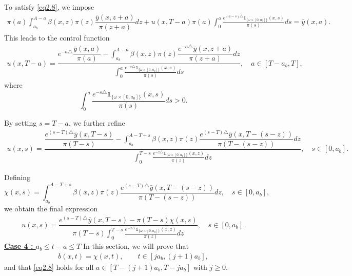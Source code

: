 \documentclass[10pt,a4paper]{amsart}
\makeatletter
\renewenvironment{proof}[1][\proofname]{\par
  \pushQED{\qed}%
  \normalfont \topsep6\p@\@plus6\p@\relax
  \trivlist
  \item[\hskip\labelsep
        \itshape
    #1\ \ref{#1}.]\ignorespaces
}{%
  \popQED\endtrivlist\@endpefalse
}
\makeatother
\begin{document}
\begin{proof}[of Proposition \ref{pr2.3}]
To satisfy \eqref{eq2.8}, we impose  
\begin{align*}
 \pi(a) \int_{a_b}^{A-a} \beta(x,z)  \pi(z) \dfrac{\bar{y}(x,z+a)}{\pi(z+a)} dz + u(x,T-a) \pi(a) \int_{0}^{a} \frac{e^{(a-s)\triangle} \mathds{1}_{\lbrace\omega\times[0,a_0]\rbrace}(x,s)}{\pi(s)} ds = \bar{y}(x,a).
\end{align*}  
This leads to the control function  
\begin{align}
    u(x,T-a) = \dfrac{e^{-a\triangle} \dfrac{\bar{y}(x,a)}{\pi(a)} - \displaystyle\int_{a_b}^{A-a} \beta(x,z)  \pi(z) \dfrac{e^{-a\triangle} \bar{y}(x,z+a)}{\pi(z+a)} dz}{\displaystyle\int_{0}^{a} \frac{e^{-s\triangle} \mathds{1}_{\lbrace\omega\times[0,a_0]\rbrace}(x,s)}{\pi(s)} ds}, \quad a\in [T-a_b,T],
\end{align}  
where  
\begin{equation*}
\int_{0}^{a} \frac{e^{-s\triangle} \mathds{1}_{\lbrace\omega\times[0,a_0]\rbrace}(x,s)}{\pi(s)} ds > 0.
\end{equation*}  

By setting \( s = T-a \), we further refine  
\begin{align*}
u(x,s) = \dfrac{\dfrac{e^{(s-T)\triangle} \bar{y}(x,T-s)}{\pi(T-s)} - \displaystyle\int_{a_b}^{A-T+s} \beta(x,z)  \pi(z) \dfrac{e^{(s-T)\triangle} \bar{y}(x,T-(s-z))}{\pi(T-(s-z))} dz}{\displaystyle\int_{0}^{T-s} \frac{e^{-z\triangle} \mathds{1}_{\lbrace\omega\times[0,a_0]\rbrace}(x,z)}{\pi(z)} dz}, \quad s\in[0,a_b].
\end{align*}  

Defining  
\begin{equation}
\chi(x,s) = \int_{a_b}^{A-T+s} \beta(x,z)  \pi(z) \dfrac{e^{(s-T)\triangle} \bar{y}(x,T-(s-z))}{\pi(T-(s-z))} dz, \quad s\in[0,a_b],
\end{equation}  
we obtain the final expression  
\begin{align}\label{eq2.17}
    u(x,s) = \dfrac{e^{(s-T)\triangle} \bar{y}(x,T-s) - \pi(T-s) \chi(x,s)}{\pi(T-s) \displaystyle\int_{0}^{T-s} \frac{e^{-z\triangle} \mathds{1}_{\lbrace\omega\times[0,a_0]\rbrace}(x,z)}{\pi(z)} dz}, \quad s\in[0,a_b].
\end{align}  
\underline{\bf{Case 4 : $a_b\leq t-a\leq T$}}  
In this section, we will prove that  
\begin{align}
b(x,t) =\chi (x,t), \qquad t\in [ja_b, (j+1)a_b],
\end{align}  
and that \eqref{eq2.8} holds for all \( a \in [T-(j+1)a_b, T-ja_b] \) with \( j \geq 0 \).  


\end{proof}
\end{document}
